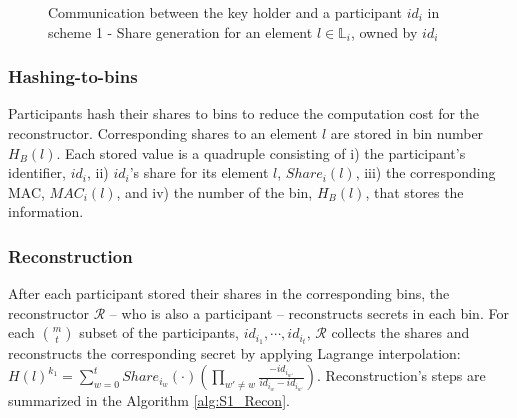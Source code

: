 \begin{figure}[h!]
   \caption{Communication between the key holder and a participant $id_i$ in scheme 1 - Share generation for an element $l \in \mathbb{L}_i$, owned by $id_i$}
   \label{fig:S1_ShareGen}
\end{figure}

\subsubsection{Hashing-to-bins}\label{Binning_S1}
Participants hash their shares to bins to reduce the computation cost for the reconstructor. Corresponding shares to an element $l$ are stored in bin number $H_B(l)$. Each stored value is a quadruple consisting of i) the participant's identifier, $id_i$, ii) $id_i$'s share for its element $l$, $Share_i(l)$, iii) the corresponding MAC, $MAC_i(l)$, and iv) the number of the bin, $H_B(l)$, that stores the information.

\subsubsection{Reconstruction}\label{Recon_S1}
After each participant stored their shares in the corresponding bins, the reconstructor  $\mathcal{R}$ -- who is also a participant -- reconstructs secrets in each bin. For each $m \choose t$ subset of the participants, $id_{i_1}, \cdots, id_{i_t}$, $\mathcal{R}$ collects the shares and reconstructs the corresponding secret by applying Lagrange interpolation: $H(l)^{k_1} = \sum^t_{w=0} Share_{i_w}(\cdot)(\prod_{w' \neq w} \frac{-id_{i_{w'}}}{id_{i_w} - id_{i_{w'}}})$. Reconstruction's steps are summarized in the Algorithm \ref{alg:S1_Recon}. 

